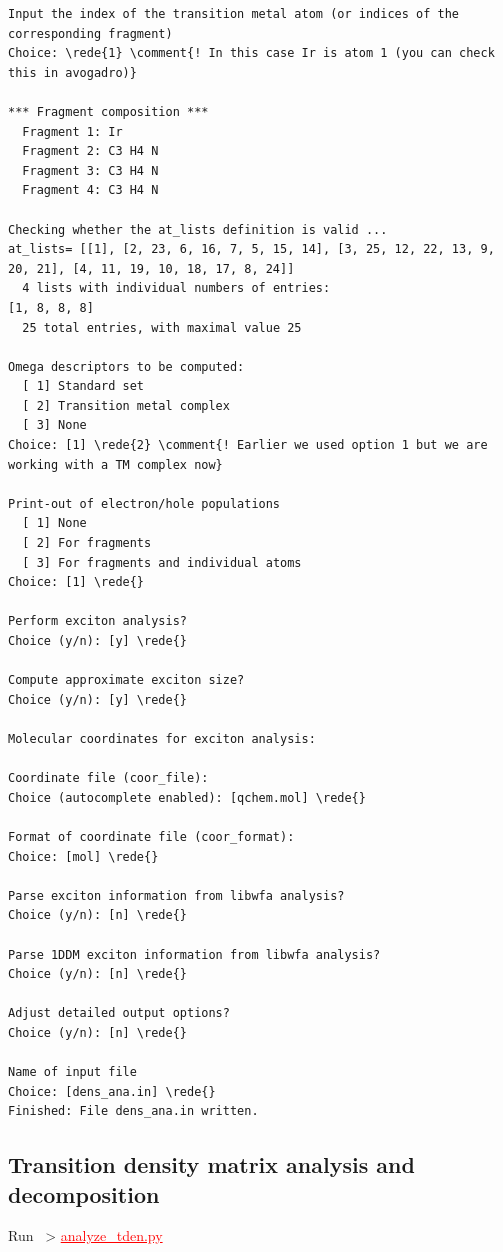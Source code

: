 \documentclass[DIV=12,headings=normal]{scrartcl}
\newcommand{\comment}[1]{\textcolor{blue}{#1}}
\newcommand{\redl}[1]{{\textcolor{red}{\underline{#1}}}}
\newcommand{\rede}[1]{\redl{#1 <ENTER>}}
\newcommand{\comm}[1]{
\small
~> \redl{#1}
\normalsize
}
\newcounter{number}
\begin{document}
\begin{Verbatim}[commandchars=\\\{\}]
Input the index of the transition metal atom (or indices of the corresponding fragment)
Choice: \rede{1} \comment{! In this case Ir is atom 1 (you can check this in avogadro)}

*** Fragment composition ***
  Fragment 1: Ir 
  Fragment 2: C3 H4 N 
  Fragment 3: C3 H4 N 
  Fragment 4: C3 H4 N 

Checking whether the at_lists definition is valid ...
at_lists= [[1], [2, 23, 6, 16, 7, 5, 15, 14], [3, 25, 12, 22, 13, 9, 20, 21], [4, 11, 19, 10, 18, 17, 8, 24]]
  4 lists with individual numbers of entries:
[1, 8, 8, 8]
  25 total entries, with maximal value 25

Omega descriptors to be computed:
  [ 1] Standard set
  [ 2] Transition metal complex
  [ 3] None
Choice: [1] \rede{2} \comment{! Earlier we used option 1 but we are working with a TM complex now} 

Print-out of electron/hole populations
  [ 1] None
  [ 2] For fragments
  [ 3] For fragments and individual atoms
Choice: [1] \rede{}

Perform exciton analysis?
Choice (y/n): [y] \rede{}

Compute approximate exciton size?
Choice (y/n): [y] \rede{}

Molecular coordinates for exciton analysis:

Coordinate file (coor_file):
Choice (autocomplete enabled): [qchem.mol] \rede{}

Format of coordinate file (coor_format):
Choice: [mol] \rede{}

Parse exciton information from libwfa analysis?
Choice (y/n): [n] \rede{}

Parse 1DDM exciton information from libwfa analysis?
Choice (y/n): [n] \rede{}

Adjust detailed output options?
Choice (y/n): [n] \rede{}

Name of input file
Choice: [dens_ana.in] \rede{}
Finished: File dens_ana.in written.

\end{Verbatim}
\normalsize

\subsection{Transition density matrix analysis and decomposition}
Run \comm{analyze\_tden.py}
\end{document}
